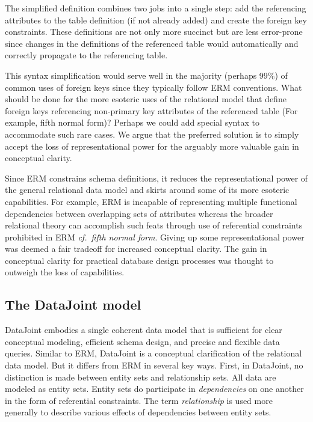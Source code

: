 \documentclass[letter,10pt]{article}
\newcommand{\datajoint}{DataJoint\xspace}
\begin{document}
The simplified definition combines two jobs into a single step:  add the referencing attributes to the table definition (if not already added) and create the foreign key constraints.  These definitions are not only more succinct but are less error-prone since changes in the definitions of the referenced table would automatically and correctly propagate to the referencing table. 

This syntax simplification would serve well in the majority (perhaps 99\%) of common uses of foreign keys since they typically follow ERM conventions. 
What should be done for the more esoteric uses of the relational model that define foreign keys referencing non-primary key attributes of the referenced table (For example, fifth normal form)?  Perhaps we could add special syntax to accommodate such rare cases. 
We argue that  the preferred solution is to simply accept the loss of representational power for the arguably more valuable gain in conceptual clarity. 

Since ERM constrains schema definitions, it reduces the representational power of the general relational data model and skirts around some of its more esoteric capabilities. 
For example, ERM is incapable of representing multiple functional dependencies between overlapping sets of attributes whereas the broader relational theory can accomplish such feats through use of referential constraints prohibited in ERM {\em cf.\ fifth normal form}.
Giving up some representational power was deemed a fair tradeoff for increased conceptual clarity.  The gain in conceptual clarity for practical database design processes was thought to outweigh the loss of capabilities.

\subsection{The \datajoint model}
\datajoint embodies a single coherent data model that is sufficient for clear conceptual modeling, efficient schema design, and precise and flexible data queries. 
Similar to ERM, \datajoint is a conceptual clarification of the relational data model.  
But it differs from ERM in several key ways. 
First, in \datajoint, no distinction is made between entity sets and relationship sets.  All data are modeled as entity sets.
Entity sets do participate in \emph{dependencies} on one another in the form of referential constraints.  The term \emph{relationship} is used more generally to describe various  effects of dependencies between entity sets.
\end{document}

